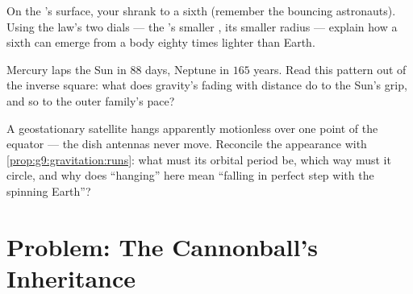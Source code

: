 \begin{exercise}[$\star\star$]\label{exo:g9:gravitation:10}
On the 's surface, your  shrank to a sixth
(remember the bouncing astronauts). Using the law's two
dials --- the 's smaller , its smaller radius ---
explain how a sixth can emerge from a body eighty times
lighter than Earth.
\end{exercise}

\begin{exercise}[$\star\star$]\label{exo:g9:gravitation:11}
Mercury laps the Sun in $88$ days, Neptune in $165$ years.
Read this pattern out of the inverse square: what does
gravity's fading with distance do to the Sun's grip, and so
to the outer family's pace?
\end{exercise}

\begin{exercise}[$\star\star\star$]\label{exo:g9:gravitation:12}
A geostationary satellite hangs apparently motionless over
one point of the equator --- the dish antennas never move.
Reconcile the appearance with
\cref{prop:g9:gravitation:runs}: what must its orbital
period be, which way must it circle, and why does
``hanging'' here mean ``falling in perfect step with the
spinning Earth''?
\end{exercise}

\section{Problem: The Cannonball's Inheritance}

